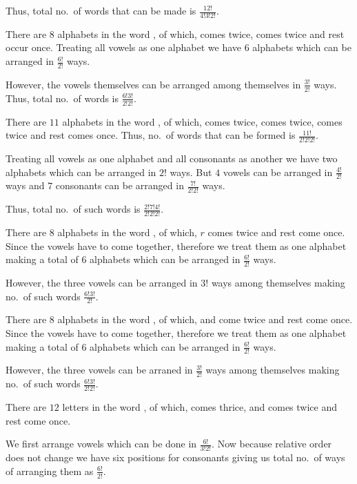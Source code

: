   Thus, total no.\ of words that can be made is $\frac{12!}{4!3!2!}$.
\item There are $8$ alphabets in the word , of which,  comes twice, 
  comes twice and rest occur once. Treating all vowels as one alphabet we have $6$ alphabets which can be
  arranged in $\frac{6!}{2!}$ ways.

  However, the vowels themselves can be arranged among themselves in $\frac{3!}{2!}$ ways. Thus, total
  no.\ of words is $\frac{6!3!}{2!2!}$.
\item There are $11$ alphabets in the word , of  which,  comes twice,
   comes twice,  comes twice and rest comes once. Thus, no.\ of words that can be formed is
  $\frac{11!}{2!2!2!}$.

  Treating all vowels as one alphabet and all consonants as another we have two alphabets which can be
  arranged in $2!$ ways. But $4$ vowels can be arranged in $\frac{4!}{2!}$ ways and $7$ consonants can be
  arranged in $\frac{7!}{2!2!}$ ways.

  Thus, total no.\ of such words is $\frac{2!7!4!}{2!2!2!}$.
\item There are $8$ alphabets in the word , of which, $r$ comes twice and rest come
  once. Since the vowels have to come together, therefore we treat them as one alphabet making a total of
  $6$ alphabets which can be arranged in $\frac{6!}{2!}$ ways.

  However, the three vowels can be arranged in $3!$ ways among themselves making no.\ of such words
  $\frac{6!3!}{2!}$.
\item There are $8$ alphabets in the word , of which,  and  come
  twice and rest come once. Since the vowels have to come together, therefore we treat them as one alphabet
  making a total of $6$ alphabets which can be arranged in $\frac{6!}{2!}$ ways.

  However, the three vowels can be arraned in $\frac{3!}{2!}$ ways among themselves making no.\ of such words
  $\frac{6!3!}{2!2!}$.
\item There are $12$ letters in the word , of which,  comes thrice,
   and  comes twice and rest come once.

  We first arrange vowels which can be done in $\frac{6!}{3!2!}$. Now because relative order does not change
  we have six positions for consonants giving us total no.\ of ways of arranging them as $\frac{6!}{2!}$.

